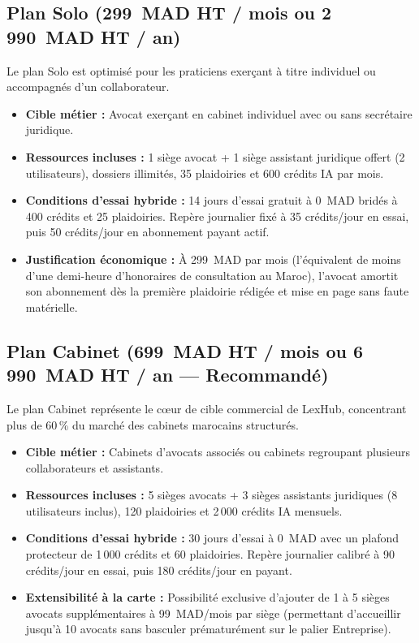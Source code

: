 \subsection{Plan Solo (299~MAD HT / mois ou 2\,990~MAD HT / an)}
Le plan Solo est optimisé pour les praticiens exerçant à titre individuel ou accompagnés d'un collaborateur.
\begin{itemize}[leftmargin=*]
  \item \textbf{Cible métier :} Avocat exerçant en cabinet individuel avec ou sans secrétaire juridique.
  \item \textbf{Ressources incluses :} 1 siège avocat + 1 siège assistant juridique offert (2 utilisateurs), dossiers illimités, 35 plaidoiries et 600 crédits IA par mois.
  \item \textbf{Conditions d'essai hybride :} 14 jours d'essai gratuit à 0~MAD bridés à 400 crédits et 25 plaidoiries. Repère journalier fixé à 35 crédits/jour en essai, puis 50 crédits/jour en abonnement payant actif.
  \item \textbf{Justification économique :} À 299~MAD par mois (l'équivalent de moins d'une demi-heure d'honoraires de consultation au Maroc), l'avocat amortit son abonnement dès la première plaidoirie rédigée et mise en page sans faute matérielle.
\end{itemize}

\subsection{Plan Cabinet (699~MAD HT / mois ou 6\,990~MAD HT / an --- Recommandé)}
Le plan Cabinet représente le cœur de cible commercial de LexHub, concentrant plus de 60\,\% du marché des cabinets marocains structurés.
\begin{itemize}[leftmargin=*]
  \item \textbf{Cible métier :} Cabinets d'avocats associés ou cabinets regroupant plusieurs collaborateurs et assistants.
  \item \textbf{Ressources incluses :} 5 sièges avocats + 3 sièges assistants juridiques (8 utilisateurs inclus), 120 plaidoiries et 2\,000 crédits IA mensuels.
  \item \textbf{Conditions d'essai hybride :} 30 jours d'essai à 0~MAD avec un plafond protecteur de 1\,000 crédits et 60 plaidoiries. Repère journalier calibré à 90 crédits/jour en essai, puis 180 crédits/jour en payant.
  \item \textbf{Extensibilité à la carte :} Possibilité exclusive d'ajouter de 1 à 5 sièges avocats supplémentaires à 99~MAD/mois par siège (permettant d'accueillir jusqu'à 10 avocats sans basculer prématurément sur le palier Entreprise).
\end{itemize}

